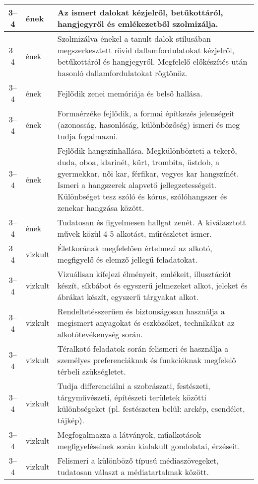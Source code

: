 \begin{small}
\begin{longtable}{c | p{2cm} |  p{11cm} }
              3--4 & ének & Az ismert dalokat kézjelről, betűkottáról, hangjegyről és emlékezetből szolmizálja. \\ \hline
              3--4 & ének & Szolmizálva énekel a tanult dalok stílusában megszerkesztett rövid dallamfordulatokat kézjelről, betűkottáról és hangjegyről. Megfelelő előkészítés után hasonló dallamfordulatokat rögtönöz. \\ \hline
              3--4 & ének & Fejlődik zenei memóriája és belső hallása. \\ \hline
              3--4 & ének & Formaérzéke fejlődik, a formai építkezés jelenségeit (azonosság, hasonlóság, különbözőség) ismeri és meg tudja fogalmazni. \\ \hline
              3--4 & ének & Fejlődik hangszínhallása. Megkülönbözteti a tekerő, duda, oboa, klarinét, kürt, trombita, üstdob, a gyermekkar, női kar, férfikar, vegyes kar hangszínét. Ismeri a hangszerek alapvető jellegzetességeit. Különbséget tesz szóló és kórus, szólóhangszer és zenekar hangzása között. \\ \hline
              3--4 & ének & Tudatosan és figyelmesen hallgat zenét. A kiválasztott művek közül 4-5 alkotást, műrészletet ismer. \\ \hline
              3--4 & vizkult & Életkorának megfelelően értelmezi az alkotó, megfigyelő és elemző jellegű feladatokat. \\ \hline
              3--4 & vizkult & Vizuálisan kifejezi élményeit, emlékeit, illusztációt készít, síkbábot és egyszerű jelmezeket alkot, jeleket és ábrákat készít, egyszerű tárgyakat alkot. \\ \hline
              3--4 & vizkult & Rendeltetésszerűen és biztonságosan használja a megismert anyagokat és eszközöket, technikákat az alkotótevékenység során. \\ \hline
              3--4 & vizkult & Téralkotó feladatok során felismeri és használja a személyes preferenciáknak és funkcióknak megfelelő térbeli szükségletet. \\ \hline
              3--4 & vizkult & Tudja  differenciálni a szobrászati, festészeti, tárgyművészeti, építészeti területek közötti különbségeket (pl. festészeten belül: arckép, csendélet, tájkép). \\ \hline
              3--4 & vizkult & Megfogalmazza a látványok, műalkotások megfigyeléseinek során kialakult gondolatai, érzéseit. \\ \hline
              3--4 & vizkult & Felismeri a különböző típusú médiaszövegeket, tudatosan választ a médiatartalmak között. \\ \hline

\end{longtable}
\end{small}
